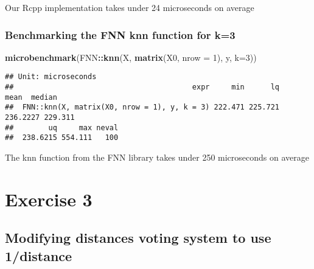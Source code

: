 \documentclass[]{article}
\newenvironment{Shaded}{\begin{snugshade}}{\end{snugshade}}
\newcommand{\DataTypeTok}[1]{\textcolor[rgb]{0.13,0.29,0.53}{#1}}
\newcommand{\DecValTok}[1]{\textcolor[rgb]{0.00,0.00,0.81}{#1}}
\newcommand{\KeywordTok}[1]{\textcolor[rgb]{0.13,0.29,0.53}{\textbf{#1}}}
\newcommand{\NormalTok}[1]{#1}
\newcommand{\OperatorTok}[1]{\textcolor[rgb]{0.81,0.36,0.00}{\textbf{#1}}}
\begin{document}
Our Rcpp implementation takes under 24 microseconds on average

\hypertarget{benchmarking-the-fnn-knn-function-for-k3}{%
\subsubsection{Benchmarking the FNN knn function for
k=3}\label{benchmarking-the-fnn-knn-function-for-k3}}

\begin{Shaded}
\begin{Highlighting}[]
\KeywordTok{microbenchmark}\NormalTok{(FNN}\OperatorTok{::}\KeywordTok{knn}\NormalTok{(X, }\KeywordTok{matrix}\NormalTok{(X0, }\DataTypeTok{nrow =} \DecValTok{1}\NormalTok{), y, }\DataTypeTok{k=}\DecValTok{3}\NormalTok{))}
\end{Highlighting}
\end{Shaded}

\begin{verbatim}
## Unit: microseconds
##                                         expr     min      lq     mean  median
##  FNN::knn(X, matrix(X0, nrow = 1), y, k = 3) 222.471 225.721 236.2227 229.311
##        uq     max neval
##  238.6215 554.111   100
\end{verbatim}

The knn function from the FNN library takes under 250 microseconds on
average

\newpage

\hypertarget{exercise-3}{%
\section{Exercise 3}\label{exercise-3}}

\hypertarget{modifying-distances-voting-system-to-use-1distance}{%
\subsection{Modifying distances voting system to use
1/distance}\label{modifying-distances-voting-system-to-use-1distance}}
\end{document}
